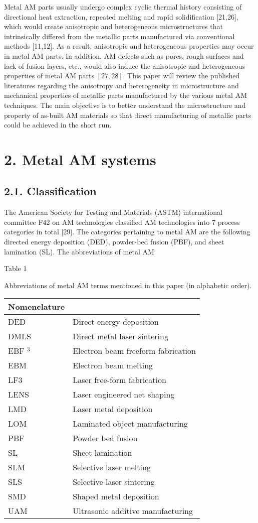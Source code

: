 \documentclass[10pt]{article}
\begin{document}
Metal AM parts usually undergo complex cyclic thermal history consisting of directional heat extraction, repeated melting and rapid solidification [21,26], which would create anisotropic and heterogeneous microstructures that intrinsically differed from the metallic parts manufactured via conventional methods [11,12]. As a result, anisotropic and heterogeneous properties may occur in metal AM parts. In addition, AM defects such as pores, rough surfaces and lack of fusion layers, etc., would also induce the anisotropic and heterogeneous properties of metal AM parts $[27,28]$. This paper will review the published literatures regarding the anisotropy and heterogeneity in microstructure and mechanical properties of metallic parts manufactured by the various metal AM techniques. The main objective is to better understand the microstructure and property of as-built AM materials so that direct manufacturing of metallic parts could be achieved in the short run.

\section*{2. Metal AM systems}
\subsection*{2.1. Classification}
The American Society for Testing and Materials (ASTM) international committee F42 on AM technologies classified AM technologies into 7 process categories in total [29]. The categories pertaining to metal AM are the following directed energy deposition (DED), powder-bed fusion (PBF), and sheet lamination (SL). The abbreviations of metal AM

Table 1

Abbreviations of metal AM terms mentioned in this paper (in alphabetic order).

\begin{center}
\begin{tabular}{ll}
\hline
Nomenclature &  \\
\hline
DED & Direct energy deposition \\
DMLS & Direct metal laser sintering \\
EBF $^{3}$ & Electron beam freeform fabrication \\
EBM & Electron beam melting \\
LF3 & Laser free-form fabrication \\
LENS & Laser engineered net shaping \\
LMD & Laser metal deposition \\
LOM & Laminated object manufacturing \\
PBF & Powder bed fusion \\
SL & Sheet lamination \\
SLM & Selective laser melting \\
SLS & Selective laser sintering \\
SMD & Shaped metal deposition \\
UAM & Ultrasonic additive manufacturing \\
\hline
\end{tabular}
\end{center}
\end{document}
